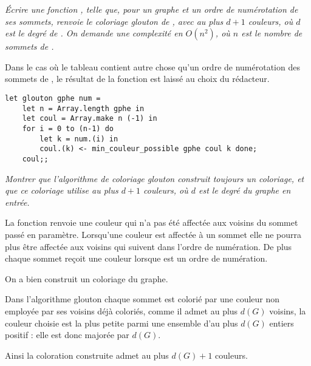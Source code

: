 \begin{Exercise} \it 
Écrire une fonction , telle que, pour un graphe  et un ordre de numérotation  de ses sommets,  renvoie le coloriage glouton de , avec au plus $d+1$ couleurs, où $d$ est le degré de . On demande une complexité en $O(n^2)$, où $n$ est le nombre de sommets de . 

Dans le cas où le tableau  contient autre chose qu'un ordre de numérotation des sommets de , le résultat de la fonction est laissé au choix du rédacteur.
\end{Exercise} 
\begin{Answer}
\begin{lstlisting}
let glouton gphe num =
    let n = Array.length gphe in
    let coul = Array.make n (-1) in
    for i = 0 to (n-1) do
        let k = num.(i) in
        coul.(k) <- min_couleur_possible gphe coul k done;
    coul;;
\end{lstlisting}
\end{Answer}
\begin{Exercise} \it 
Montrer que l'algorithme de coloriage glouton construit toujours un coloriage, et que ce coloriage utilise au plus $d+1$ couleurs, où $d$ est le degré du graphe en entrée. 
\end{Exercise} 
\begin{Answer}
La fonction  renvoie une couleur qui n'a pas été affectée aux voisins du sommet passé en paramètre.
Lorsqu'une couleur est affectée à un sommet elle ne pourra plus être affectée aux voisins qui suivent dans l'ordre de numération.
De plus chaque sommet reçoit une couleur lorsque  est un ordre de numération.

On a bien construit un coloriage du graphe.

\medskip

Dans l'algorithme glouton chaque sommet est colorié par une couleur non employée par ses voisins déjà coloriés, comme il admet au plus $d(G)$ voisins, la couleur choisie est la plus petite parmi une ensemble d'au plus $d(G)$ entiers positif : elle est donc majorée par $d(G)$.

Ainsi la coloration construite admet au plus $d(G)+1$ couleurs.
\end{Answer}
